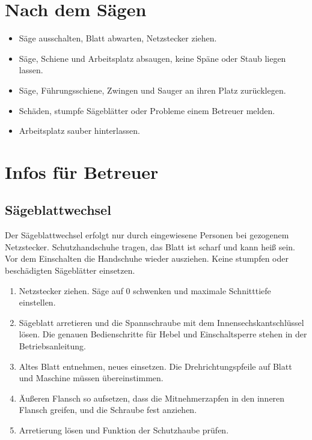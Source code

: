 \documentclass{\basedir/fablab-document}
\begin{document}
	\section{Nach dem Sägen}

	\begin{itemize}
		\item Säge ausschalten, Blatt abwarten, Netzstecker ziehen.
		\item Säge, Schiene und Arbeitsplatz absaugen, keine Späne oder Staub liegen lassen.
		\item Säge, Führungsschiene, Zwingen und Sauger an ihren Platz zurücklegen.
		\item Schäden, stumpfe Sägeblätter oder Probleme einem Betreuer melden.
		\item Arbeitsplatz sauber hinterlassen.
	\end{itemize}

	\section{Infos für Betreuer}

	\subsection{Sägeblattwechsel}
	Der Sägeblattwechsel erfolgt nur durch eingewiesene Personen bei gezogenem Netzstecker. Schutzhandschuhe tragen, das Blatt ist scharf und kann heiß sein. Vor dem Einschalten die Handschuhe wieder ausziehen. Keine stumpfen oder beschädigten Sägeblätter einsetzen.
	\begin{enumerate}
		\item Netzstecker ziehen. Säge auf 0\textdegree{} schwenken und maximale Schnitttiefe einstellen.
		\item Sägeblatt arretieren und die Spannschraube mit dem Innensechskantschlüssel lösen. Die genauen Bedienschritte für Hebel und Einschaltsperre stehen in der Betriebsanleitung.
		\item Altes Blatt entnehmen, neues einsetzen. Die Drehrichtungspfeile auf Blatt und Maschine müssen übereinstimmen.
		\item Äußeren Flansch so aufsetzen, dass die Mitnehmerzapfen in den inneren Flansch greifen, und die Schraube fest anziehen.
		\item Arretierung lösen und Funktion der Schutzhaube prüfen.
	\end{enumerate}
\end{document}
